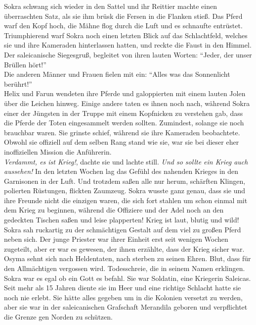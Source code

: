 Sokra schwang sich wieder in den Sattel und ihr Reittier machte einen überraschten Satz, als sie 
ihm brüsk die Fersen in die Flanken stieß. Das Pferd warf den Kopf hoch, die Mähne flog durch die 
Luft und es schnaufte entrüstet. Triumphierend warf Sokra noch einen letzten Blick auf das 
Schlachtfeld, welches sie und ihre Kameraden hinterlassen hatten, und reckte die Faust in den 
Himmel. Der saleicanische Siegesgruß, begleitet von ihren lauten Worten: ``Jeder, der unser Brüllen 
hört!''\\
Die anderen Männer und Frauen fielen mit ein: ``Alles was das Sonnenlicht berührt!''\\
Helix und Farun wendeten ihre Pferde und galoppierten mit einem lauten Jolen über die Leichen 
hinweg. Einige andere taten es ihnen noch nach, während Sokra einer der Jüngsten in der Truppe mit 
einem Kopfnicken zu verstehen gab, dass die Pferde der Toten eingesammelt werden sollten. 
Zumindest, solange sie noch brauchbar waren. Sie grinste schief, während sie ihre Kameraden 
beobachtete. Obwohl sie offiziell auf dem selben Rang stand wie sie, war sie bei dieser eher 
inoffiziellen Mission die Anführerin.\\
\textit{Verdammt, es ist Krieg!}, dachte sie und lachte still. \textit{Und so sollte ein Krieg auch 
aussehen!}
In den letzten Wochen lag das Gefühl des nahenden Krieges in den Garnisonen in der Luft. Und 
trotzdem saßen alle nur herum, schärften Klingen, polierten Rüstungen, flickten Zaumzeug. Sokra 
wusste ganz genau, dass sie und ihre Freunde nicht die einzigen waren, die sich fort stahlen um 
schon einmal mit dem Krieg zu beginnen, während die Offiziere und der Adel noch an den gedeckten 
Tischen saßen und leise plapperten! Krieg ist laut, blutig und wild!\\
Sokra sah ruckartig zu der schmächtigen Gestalt auf dem viel zu großen Pferd neben sich. Der junge 
Priester war ihrer Einheit erst seit wenigen Wochen zugeteilt, aber er war es gewesen, der ihnen 
erzählte, dass der Krieg sicher war. Osyma sehnt sich nach Heldentaten, nach sterben zu seinen 
Ehren. Blut, dass für den Allmächtigen vergossen wird. Todesschreie, die in seinem Namen erklingen. 
Sokra war es egal ob ein Gott es befahl. Sie war Soldatin, eine Kriegerin Saleicas. Seit 
mehr als 15 Jahren diente sie im Heer und eine richtige Schlacht hatte sie noch nie erlebt. Sie 
hätte alles gegeben um in die Kolonien versetzt zu werden, aber sie war in der saleicanischen 
Grafschaft Merandila geboren und verpflichtet die Grenze gen Norden zu schützen.\\
